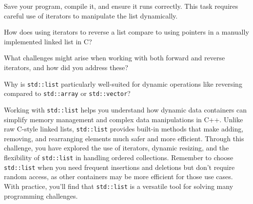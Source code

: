 \begin{challenge}
\begin{task}
        Save your program, compile it, and ensure it runs correctly. This task requires careful use of iterators to manipulate the list dynamically.

        \begin{questions}
            \item How does using iterators to reverse a list compare to using pointers in a manually implemented linked list in C?
            \item What challenges might arise when working with both forward and reverse iterators, and how did you address these?
            \item Why is \texttt{std::list} particularly well-suited for dynamic operations like reversing compared to \texttt{std::array} or \texttt{std::vector}?
        \end{questions}
    \end{task}

    \begin{advise}
        Working with \texttt{std::list} helps you understand how dynamic data containers can simplify memory management and complex data manipulations in C++. 
        Unlike raw C-style linked lists, \texttt{std::list} provides built-in methods that make adding, removing, and rearranging elements much safer and more efficient. 
        Through this challenge, you have explored the use of iterators, dynamic resizing, and the flexibility of \texttt{std::list} in handling ordered collections. 
        Remember to choose \texttt{std::list} when you need frequent insertions and deletions but don't require random access, as other containers may be more efficient for those use cases. 
        With practice, you'll find that \texttt{std::list} is a versatile tool for solving many programming challenges.
    \end{advise}
\end{challenge}
